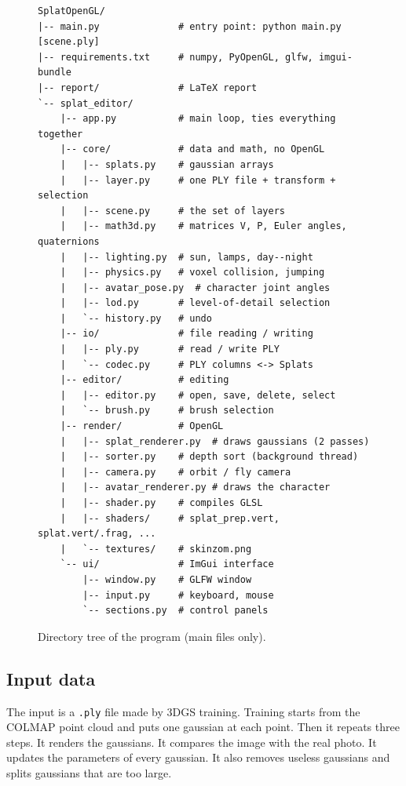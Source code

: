 \documentclass[9pt,twocolumn,a4paper]{extarticle}
\newcommand{\code}[1]{\texttt{#1}}
\begin{document}
\begin{figure}[H]
\centering
\begin{Verbatim}[fontsize=\fontsize{5.6}{6.6}\selectfont,frame=single]
SplatOpenGL/
|-- main.py              # entry point: python main.py [scene.ply]
|-- requirements.txt     # numpy, PyOpenGL, glfw, imgui-bundle
|-- report/              # LaTeX report
`-- splat_editor/
    |-- app.py           # main loop, ties everything together
    |-- core/            # data and math, no OpenGL
    |   |-- splats.py    # gaussian arrays
    |   |-- layer.py     # one PLY file + transform + selection
    |   |-- scene.py     # the set of layers
    |   |-- math3d.py    # matrices V, P, Euler angles, quaternions
    |   |-- lighting.py  # sun, lamps, day--night
    |   |-- physics.py   # voxel collision, jumping
    |   |-- avatar_pose.py  # character joint angles
    |   |-- lod.py       # level-of-detail selection
    |   `-- history.py   # undo
    |-- io/              # file reading / writing
    |   |-- ply.py       # read / write PLY
    |   `-- codec.py     # PLY columns <-> Splats
    |-- editor/          # editing
    |   |-- editor.py    # open, save, delete, select
    |   `-- brush.py     # brush selection
    |-- render/          # OpenGL
    |   |-- splat_renderer.py  # draws gaussians (2 passes)
    |   |-- sorter.py    # depth sort (background thread)
    |   |-- camera.py    # orbit / fly camera
    |   |-- avatar_renderer.py # draws the character
    |   |-- shader.py    # compiles GLSL
    |   |-- shaders/     # splat_prep.vert, splat.vert/.frag, ...
    |   `-- textures/    # skinzom.png
    `-- ui/              # ImGui interface
        |-- window.py    # GLFW window
        |-- input.py     # keyboard, mouse
        `-- sections.py  # control panels
\end{Verbatim}
\caption{Directory tree of the program (main files only).}
\label{fig:tree}
\end{figure}

\subsection{Input data}
\label{sec:input}
The input is a \code{.ply} file made by 3DGS training. Training starts from the COLMAP point cloud and puts one gaussian at each point. Then it repeats three steps. It renders the gaussians. It compares the image with the real photo. It updates the parameters of every gaussian. It also removes useless gaussians and splits gaussians that are too large.
\end{document}
